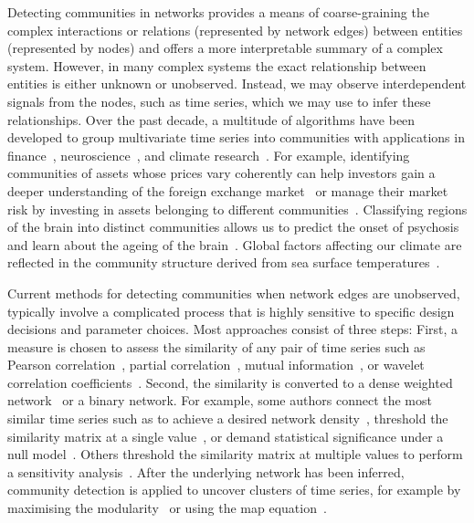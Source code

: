 \documentclass[onecolumn,pre,superscriptaddress, longbibliography, nofootinbib, notitlepage]{revtex4-1}
\begin{document}
Detecting communities in networks provides a means of coarse-graining the complex interactions or relations (represented by network edges) between entities (represented by nodes) and offers a more interpretable summary of a complex system. However, in many complex systems the exact relationship between entities is either unknown or unobserved. Instead, we may observe interdependent signals from the nodes, such as time series, which we may use to infer these relationships. Over the past decade, a multitude of algorithms have been developed to group multivariate time series into communities with applications in finance~\cite{Fenn2009,Fenn2012,Bazzi2016,Ando2017}, neuroscience~\cite{Meunier2009, Lord2012}, and climate research~\cite{Tantet2014}. For example, identifying communities of assets whose prices vary coherently can help investors gain a deeper understanding of the foreign exchange market~\cite{Fenn2009, Fenn2012} or manage their market risk by investing in assets belonging to different communities~\cite{MacMahon2015}. Classifying regions of the brain into distinct communities allows us to predict the onset of psychosis~\cite{Lord2012} and learn about the ageing of the brain~\cite{Chan2014}. Global factors affecting our climate are reflected in the community structure derived from sea surface temperatures~\cite{Tantet2014}.

Current methods for detecting communities when network edges are unobserved, typically involve a complicated process that is highly sensitive to specific design decisions and parameter choices. Most approaches consist of three steps: First, a measure is chosen to assess the similarity of any pair of time series such as Pearson correlation~\cite{Bazzi2016, Chan2014, Fenn2009, Fenn2012, Tantet2014, Wu2015}, partial correlation~\cite{Lord2012, Pandit2013, Yu2014}, mutual information~\cite{Donges2009}, or wavelet correlation coefficients~\cite{Alexander-Bloch2012, Betzel2016, Meunier2009}. Second, the similarity is converted to a dense weighted network~\cite{Fenn2009, Fenn2012, Bazzi2016, Betzel2016} or a binary network. For example, some authors connect the most similar time series such as to achieve a desired network density~\cite{Donges2009}, threshold the similarity matrix at a single value~\cite{Meunier2009,Tantet2014}, or demand statistical significance under a null model~\cite{Lord2012, Pandit2013, Yu2014}. Others threshold the similarity matrix at multiple values to perform a sensitivity analysis~\cite{Alexander-Bloch2012, Chan2014, Wu2015}. After the underlying network has been inferred, community detection is applied to uncover clusters of  time series, for example by maximising the modularity~\cite{Alexander-Bloch2012, Betzel2016, Fenn2009, Fenn2012, Meunier2009, Wu2015} or using the map equation~\cite{rosvall2008maps, Tantet2014, Chan2014}.
\end{document}
